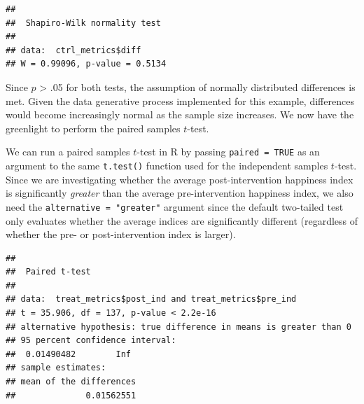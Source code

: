 \documentclass[]{book}
\newenvironment{Shaded}{\begin{snugshade}}{\end{snugshade}}
\newcommand{\CommentTok}[1]{\textcolor[rgb]{0.56,0.35,0.01}{\textit{#1}}}
\newcommand{\DataTypeTok}[1]{\textcolor[rgb]{0.13,0.29,0.53}{#1}}
\newcommand{\KeywordTok}[1]{\textcolor[rgb]{0.13,0.29,0.53}{\textbf{#1}}}
\newcommand{\NormalTok}[1]{#1}
\newcommand{\OperatorTok}[1]{\textcolor[rgb]{0.81,0.36,0.00}{\textbf{#1}}}
\newcommand{\OtherTok}[1]{\textcolor[rgb]{0.56,0.35,0.01}{#1}}
\newcommand{\StringTok}[1]{\textcolor[rgb]{0.31,0.60,0.02}{#1}}
\begin{document}
\begin{Shaded}
\end{Shaded}

\begin{verbatim}
## 
##  Shapiro-Wilk normality test
## 
## data:  ctrl_metrics$diff
## W = 0.99096, p-value = 0.5134
\end{verbatim}

Since \(p\) \textgreater{} .05 for both tests, the assumption of normally distributed differences is met. Given the data generative process implemented for this example, differences would become increasingly normal as the sample size increases. We now have the greenlight to perform the paired samples \(t\)-test.

We can run a paired samples \(t\)-test in R by passing \texttt{paired\ =\ TRUE} as an argument to the same \texttt{t.test()} function used for the independent samples \(t\)-test. Since we are investigating whether the average post-intervention happiness index is significantly \emph{greater} than the average pre-intervention happiness index, we also need the \texttt{alternative\ =\ "greater"} argument since the default two-tailed test only evaluates whether the average indices are significantly different (regardless of whether the pre- or post-intervention index is larger).

\begin{Shaded}
\end{Shaded}

\begin{verbatim}
## 
##  Paired t-test
## 
## data:  treat_metrics$post_ind and treat_metrics$pre_ind
## t = 35.906, df = 137, p-value < 2.2e-16
## alternative hypothesis: true difference in means is greater than 0
## 95 percent confidence interval:
##  0.01490482        Inf
## sample estimates:
## mean of the differences 
##              0.01562551
\end{verbatim}
\end{document}
